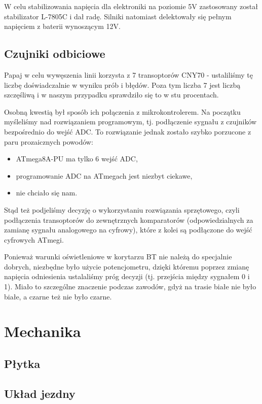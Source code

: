 \documentclass{article}
\begin{document}
W celu stabilizowania napięcia dla elektroniki na poziomie 5V zastosowany został stabilizator L-7805C i dał radę.  Silniki natomiast delektowały się pełnym napięciem z baterii wynoszącym 12V.

\subsection{Czujniki odbiciowe}

Papaj w celu wywęszenia linii korzysta z 7 transoptorów CNY70 - ustaliliśmy tę liczbę doświadczalnie w wyniku prób i błędów. Poza tym liczba 7 jest liczbą szczęśliwą i w naszym przypadku sprawdziło się to w stu procentach.

Osobną kwestią był sposób ich połączenia z mikrokontrolerem. Na początku myśleliśmy nad rozwiązaniem programowym, tj. podłączenie sygnału z czujników bezpośrednio do wejść ADC. To rozwiązanie jednak zostało szybko porzucone z paru prozaicznych powodów:
\begin{itemize}
\item ATmega8A-PU ma tylko 6 wejść ADC,
\item programowanie ADC na ATmegach jest niezbyt ciekawe,
\item nie chciało się nam.
\end{itemize}

Stąd też podjeliśmy decyzję o wykorzystaniu rozwiązania sprzętowego, czyli podłączenia transoptorów do zewnętrznych komparatorów (odpowiedzialnych za zamianę sygnału analogowego na cyfrowy), które z kolei są podłączone do wejść cyfrowych ATmegi. 

Ponieważ warunki oświetleniowe w korytarzu BT nie należą do specjalnie dobrych, niezbędne było użycie potencjometru, dzięki któremu poprzez zmianę napięcia odniesienia ustalaliśmy próg decyzji (tj. przejścia między sygnałem 0 i 1). Miało to szczególne znaczenie podczas zawodów, gdyż na trasie białe nie było białe, a czarne też nie było czarne. 

\section{Mechanika}

\subsection{Płytka}


\subsection{Układ jezdny}

\end{document}
